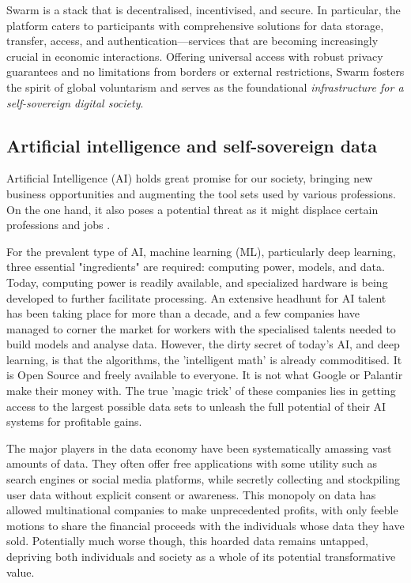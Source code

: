 Swarm is a  stack that is decentralised, incentivised, and secure. In particular, the platform caters to participants with comprehensive solutions for data storage, transfer, access, and authentication—services that are becoming increasingly crucial in economic interactions. Offering universal access with robust privacy guarantees and no limitations from borders or external restrictions, Swarm fosters the spirit of global voluntarism and serves as the foundational \emph{infrastructure for a self-sovereign digital society}.

\subsection{Artificial intelligence and self-sovereign data \statusgreen} \label{sec:AIdata}

Artificial Intelligence (AI) holds great promise for our society, bringing new business opportunities and augmenting the tool sets used by various professions. On the one hand, it also poses a potential threat as it might displace certain professions and jobs \cite{Lee2018Sep}.

For the prevalent type of AI, machine learning (ML), particularly deep learning, three essential "ingredients" are required: computing power, models, and data. Today, computing power is readily available, and specialized hardware is being developed to further facilitate processing. An extensive headhunt for AI talent has been taking place for more than a decade, and a few companies have managed to corner the market for workers with the specialised talents needed to build models and analyse data. However, the dirty secret of today's AI, and deep learning, is that the algorithms, the 'intelligent math' is already commoditised. It is Open Source and freely available to everyone. It is not what Google or Palantir make their money with. The true 'magic trick' of these companies lies in getting access to the largest possible data sets to unleash the full potential of their AI systems for profitable gains.

The major players in the data economy have been systematically amassing vast amounts of data. They often offer  free applications with some utility such as search engines or social media platforms, while secretly collecting and stockpiling user data without explicit consent or awareness. This monopoly on data has allowed multinational companies to make unprecedented profits, with only feeble motions to share the financial proceeds with the individuals whose data they have sold. Potentially much worse though, this hoarded data remains untapped, depriving both individuals and society as a whole of its potential transformative value.

